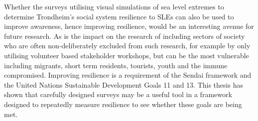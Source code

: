 Whether the surveys utilising visual simulations of sea level extremes to determine Trondheim's social system resilience to SLEs can also be used to improve awareness, hence improving resilience, would be an interesting avenue for future research. As is the impact on the research of including sectors of society who are often non-deliberately excluded from such research, for example by only utilising volunteer based stakeholder workshops, but can be the most vulnerable including migrants, short term residents, tourists, youth and the immune compromised. Improving resilience is a requirement of the Sendai framework and the United Nations Sustainable Development Goals 11 and 13. This thesis has shown that carefully designed surveys may be a useful tool in a framework designed to repeatedly measure resilience to see whether these goals are being met.


